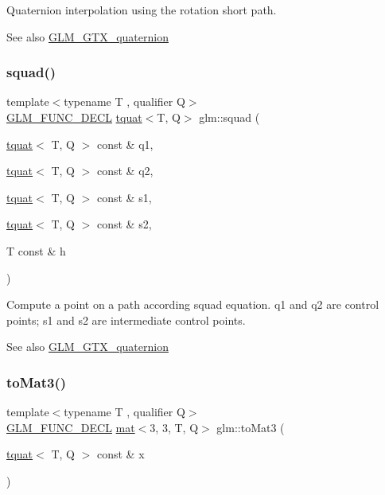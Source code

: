 Quaternion interpolation using the rotation short path.

\begin{DoxySeeAlso}{See also}
\hyperlink{group__gtx__quaternion}{G\+L\+M\+\_\+\+G\+T\+X\+\_\+quaternion} 
\end{DoxySeeAlso}
\mbox{\label{group__gtx__quaternion_gacfcb16619e166e672c4672aff50a565c}} 
\subsubsection{\texorpdfstring{squad()}{squad()}}
{\footnotesize\ttfamily template$<$typename T , qualifier Q$>$ \\
\hyperlink{setup_8hpp_ab2d052de21a70539923e9bcbf6e83a51}{G\+L\+M\+\_\+\+F\+U\+N\+C\+\_\+\+D\+E\+CL} \hyperlink{structglm_1_1tquat}{tquat}$<$T, Q$>$ glm\+::squad (\begin{DoxyParamCaption}\item[{\hyperlink{structglm_1_1tquat}{tquat}$<$ T, Q $>$ const \&}]{q1,  }\item[{\hyperlink{structglm_1_1tquat}{tquat}$<$ T, Q $>$ const \&}]{q2,  }\item[{\hyperlink{structglm_1_1tquat}{tquat}$<$ T, Q $>$ const \&}]{s1,  }\item[{\hyperlink{structglm_1_1tquat}{tquat}$<$ T, Q $>$ const \&}]{s2,  }\item[{T const \&}]{h }\end{DoxyParamCaption})}

Compute a point on a path according squad equation. q1 and q2 are control points; s1 and s2 are intermediate control points.

\begin{DoxySeeAlso}{See also}
\hyperlink{group__gtx__quaternion}{G\+L\+M\+\_\+\+G\+T\+X\+\_\+quaternion} 
\end{DoxySeeAlso}
\mbox{\label{group__gtx__quaternion_ga433955cb703d982427fb53b540d02f3d}} 
\subsubsection{\texorpdfstring{to\+Mat3()}{toMat3()}}
{\footnotesize\ttfamily template$<$typename T , qualifier Q$>$ \\
\hyperlink{setup_8hpp_ab2d052de21a70539923e9bcbf6e83a51}{G\+L\+M\+\_\+\+F\+U\+N\+C\+\_\+\+D\+E\+CL} \hyperlink{structglm_1_1mat}{mat}$<$3, 3, T, Q$>$ glm\+::to\+Mat3 (\begin{DoxyParamCaption}\item[{\hyperlink{structglm_1_1tquat}{tquat}$<$ T, Q $>$ const \&}]{x }\end{DoxyParamCaption})}

